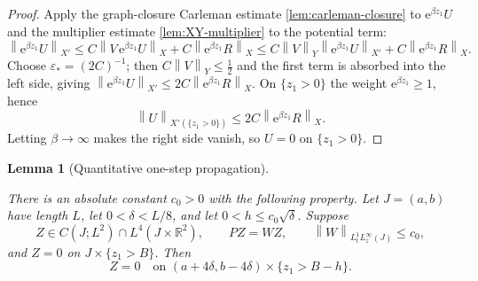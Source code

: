 \documentclass[11pt,oneside]{book}
\providecommand{\uses}[1]{}
\newtheorem{lemma}[theorem]{Lemma}
\theoremstyle{definition}
\theoremstyle{remark}
\newcommand{\R}{\mathbb R}
\newcommand{\1}{\mathbf 1}
\newcommand{\norm}[1]{\left\lVert #1\right\rVert}
\newcommand{\e}{\mathrm e}
\newcommand{\eps}{\varepsilon}
\begin{document}
\begin{proof}
\uses{lem:carleman-closure, lem:XY-multiplier, lem:exponential-separation}
Apply the graph-closure Carleman estimate \cref{lem:carleman-closure} to $\e^{\beta z_1}U$ and the multiplier estimate \cref{lem:XY-multiplier} to the potential term:
\[
 \norm{\e^{\beta z_1}U}_{X'}
 \le C\norm{V\,\e^{\beta z_1}U}_{X}+C\norm{\e^{\beta z_1}R}_{X}
 \le C\norm{V}_Y\norm{\e^{\beta z_1}U}_{X'}+C\norm{\e^{\beta z_1}R}_{X}.
\]
Choose $\eps_*=(2C)^{-1}$; then $C\norm{V}_Y\le\tfrac12$ and the first term is absorbed into the left side, giving $\norm{\e^{\beta z_1}U}_{X'}\le 2C\norm{\e^{\beta z_1}R}_{X}$. On $\{z_1>0\}$ the weight $\e^{\beta z_1}\ge1$, hence
\[
 \norm{U}_{X'(\{z_1>0\})}\le 2C\norm{\e^{\beta z_1}R}_{X}.
\]
Letting $\beta\to\infty$ makes the right side vanish, so $U=0$ on $\{z_1>0\}$.
\end{proof}

\begin{lemma}[Quantitative one-step propagation]\label{lem:one-step-propagation}
\uses{lem:one-slab, def:moving-interface-scale}
There is an absolute constant $c_0>0$ with the following property. Let $J=(a,b)$ have length $L$, let $0<\delta<L/8$, and let $0<h\le c_0\sqrt\delta$. Suppose
\[
 Z\in C(J;L^2)\cap L^4(J\times\R^2),
 \qquad PZ=WZ,
 \qquad \norm{W}_{L^1_tL^\infty_z(J)}\le c_0,
\]
and $Z=0$ on $J\times\{z_1>B\}$. Then
\[
 Z=0\quad\text{on }(a+4\delta,b-4\delta)\times\{z_1>B-h\}.
\]
\end{lemma}
\end{document}
